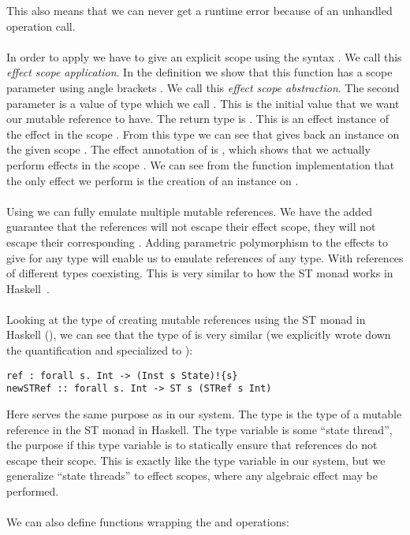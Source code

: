 This also means that we can never get a runtime error because of an unhandled operation call.
\\\\
In order to apply  we have to give an explicit scope  using the syntax .
We call this \emph{effect scope application}.
In the definition we show that this function has a scope parameter using angle brackets \ident{[s]}.
We call this \emph{effect scope abstraction}.
The second parameter is a value of type  which we call .
This is the initial value that we want our mutable reference to have.
The return type is .
This is an effect instance of the  effect in the scope .
From this type we can see that  gives back an instance on the given scope .
The effect annotation of  is , which shows that we actually perform effects in the scope .
We can see from the function implementation that the only effect we perform is the creation of an instance on .
\\\\
Using  we can fully emulate multiple mutable references.
We have the added guarantee that the references will not escape their effect scope, they will not escape their corresponding .
Adding parametric polymorphism to the effects to give  for any type  will enable us to emulate references of any type.
With references of different types coexisting.
This is very similar to how the ST monad works in Haskell~\autocite{runst}.
\\\\
Looking at the type of creating mutable references using the ST monad in Haskell (), we can see that the type of  is very similar
(we explicitly wrote down the quantification and specialized  to ):

\begin{verbatim}
ref : forall s. Int -> (Inst s State)!{s}
newSTRef :: forall s. Int -> ST s (STRef s Int)
\end{verbatim}

Here  serves the same purpose as  in our system.
The type  is the type of a mutable reference in the ST monad in Haskell.
The type variable  is some ``state thread'', the purpose if this type variable is to statically ensure that references do not escape their scope.
This is exactly like the  type variable in our system, but we generalize ``state threads'' to effect scopes, where any algebraic effect may be performed.
\\\\
We can also define functions wrapping the  and  operations:

